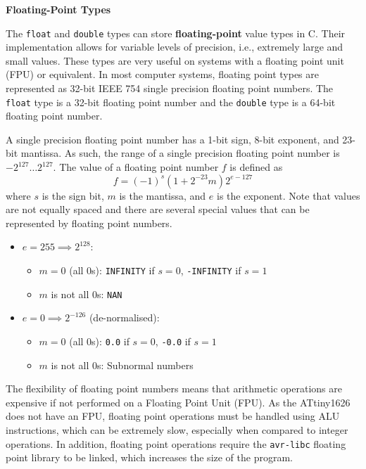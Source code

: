 \documentclass{article}
\begin{document}
\vspace{1em}
\textbf{Floating-Point Types}
\vspace{1em}

The \texttt{float} and \texttt{double} types can store
\textbf{floating-point} value types in C. Their implementation allows
for variable levels of precision, i.e., extremely large and small
values. These types are very useful on systems with a floating point
unit (FPU) or equivalent. In most computer systems, floating point
types are represented as 32-bit IEEE 754 single precision floating
point numbers. The \texttt{float} type is a 32-bit floating
point number and the \texttt{double} type is a 64-bit floating
point number.

A single precision floating point number has a 1-bit sign, 8-bit
exponent, and 23-bit mantissa. As such, the range of a single precision
floating point number is \(-2^{127} \ldots 2^{127}\). The value of a
floating point number \(f\) is defined as
\begin{equation*}
    f = \left( -1 \right)^s \left( 1 + 2^{-23} m \right) 2^{e - 127}
\end{equation*}
where \(s\) is the sign bit, \(m\) is the mantissa, and \(e\) is the
exponent. Note that values are not equally spaced and there are several
special values that can be represented by floating point numbers.
\begin{itemize}
    \item \(e = 255 \implies 2^{128}\):
          \begin{itemize}
              \item \(m = 0\) (all 0s): \texttt{INFINITY} if \(s = 0\), \texttt{-INFINITY} if \(s = 1\)
              \item \(m\) is not all 0s: \texttt{NAN}
          \end{itemize}
    \item \(e = 0 \implies 2^{-126}\) (de-normalised):
          \begin{itemize}
              \item \(m = 0\) (all 0s): \texttt{0.0} if \(s = 0\), \texttt{-0.0} if \(s = 1\)
              \item \(m\) is not all 0s: Subnormal numbers
          \end{itemize}
\end{itemize}
The flexibility of floating point numbers means that arithmetic
operations are expensive if not performed on a Floating Point Unit
(FPU). As the ATtiny1626 does not have an FPU, floating point operations
must be handled using ALU instructions, which can be extremely slow,
especially when compared to integer operations. In addition, floating
point operations require the \texttt{avr-libc} floating point
library to be linked, which increases the size of the program.
\end{document}
